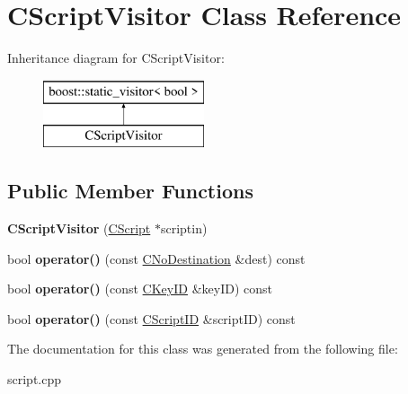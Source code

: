 \hypertarget{class_c_script_visitor}{}\section{C\+Script\+Visitor Class Reference}
\label{class_c_script_visitor}
Inheritance diagram for C\+Script\+Visitor\+:\begin{figure}[H]
\begin{center}
\leavevmode
\includegraphics[height=2.000000cm]{class_c_script_visitor}
\end{center}
\end{figure}
\subsection*{Public Member Functions}
\begin{DoxyCompactItemize}
\item 
\mbox{\label{class_c_script_visitor_acfe7eb4f2ddca134614bf7583e73b3da}} 
{\bfseries C\+Script\+Visitor} (\mbox{\hyperlink{class_c_script}{C\+Script}} $\ast$scriptin)
\item 
\mbox{\label{class_c_script_visitor_aee67fc2ddbe2b81cdc399dae2f2b9557}} 
bool {\bfseries operator()} (const \mbox{\hyperlink{class_c_no_destination}{C\+No\+Destination}} \&dest) const
\item 
\mbox{\label{class_c_script_visitor_afd32f5c3d99cb34fd5423e73f6a631aa}} 
bool {\bfseries operator()} (const \mbox{\hyperlink{class_c_key_i_d}{C\+Key\+ID}} \&key\+ID) const
\item 
\mbox{\label{class_c_script_visitor_ac5ec2dcc0d9cdeb5026d67e731a1a0de}} 
bool {\bfseries operator()} (const \mbox{\hyperlink{class_c_script_i_d}{C\+Script\+ID}} \&script\+ID) const
\end{DoxyCompactItemize}


The documentation for this class was generated from the following file\+:\begin{DoxyCompactItemize}
\item 
script.\+cpp\end{DoxyCompactItemize}
